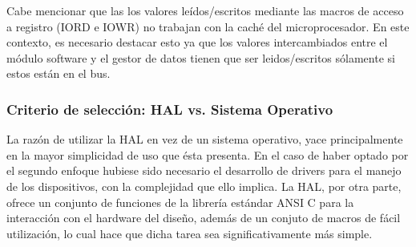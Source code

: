Cabe mencionar que las los valores leídos/escritos mediante las macros de acceso a registro (IORD e IOWR) no trabajan con la caché del microprocesador.
En este contexto, es necesario destacar esto ya que los valores intercambiados entre el módulo software y el gestor de datos tienen que ser leidos/escritos sólamente si estos están en el bus.

\subsubsection{Criterio de selección: HAL vs. Sistema Operativo}

La razón de utilizar la HAL en vez de un sistema operativo, yace principalmente en la mayor simplicidad de uso que ésta presenta. En el caso de haber optado por el segundo enfoque hubiese sido necesario el desarrollo de drivers para el manejo de los dispositivos, con la complejidad que ello implica. La HAL, por otra parte, ofrece un conjunto de funciones de la librería estándar ANSI C para la interacción con el hardware del diseño, además de un conjuto de macros de fácil utilización, lo cual hace que dicha tarea sea significativamente más simple.


